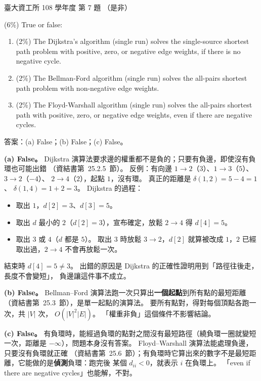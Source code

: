 \begin{pastexam}[label={px:ntu-108-dsaa-07}]{臺大資工所 108 學年度 第 7 題}
（是非）

(6\%) True or false:
\begin{enumerate}[label=(\alph*)]
\item (2\%) The Dijkstra's algorithm (single run) solves the single-source shortest path problem
with positive, zero, or negative edge weights, if there is no negative cycle.
\item (2\%) The Bellman-Ford algorithm (single run) solves the all-pairs shortest path problem
with non-negative edge weights.
\item (2\%) The Floyd-Warshall algorithm (single run) solves the all-pairs shortest path with
positive, zero, or negative edge weights, even if there are negative cycles.
\end{enumerate}
\end{pastexam}

\begin{pastsoln}
答案：(a) False；(b) False；(c) False。

\textbf{(a) False。} Dijkstra 演算法要求邊的權重都不是負的；只要有負邊，即使沒有負環也可能出錯
（資結書第~25.2.5~節）。 反例：有向邊 $1 \to 2$（$3$）、$1 \to 3$（$5$）、$3 \to 2$（$-4$）、
$2 \to 4$（$2$），起點 $1$，沒有環。 真正的距離是 $\delta(1, 2) = 5 - 4 = 1$、
$\delta(1, 4) = 1 + 2 = 3$。 Dijkstra 的過程：
\begin{itemize}
\item 取出 $1$，$d[2] = 3$、$d[3] = 5$。
\item 取出 $d$ 最小的 $2$（$d[2] = 3$），宣布確定，放鬆 $2 \to 4$ 得 $d[4] = 5$。
\item 取出 $3$ 或 $4$（$d$ 都是 $5$）。 取出 $3$ 時放鬆 $3 \to 2$，$d[2]$ 就算被改成 $1$，$2$ 已經
取出過，$2 \to 4$ 不會再放鬆一次。
\end{itemize}
結束時 $d[4] = 5 \ne 3$。 出錯的原因是 Dijkstra 的正確性證明用到「路徑往後走，長度不會變短」，
負邊讓這件事不成立。

\textbf{(b) False。} Bellman--Ford 演算法跑一次只算出\textbf{一個起點}到所有點的最短距離
（資結書第~25.3~節），是單一起點的演算法。 要所有點對，得對每個頂點各跑一次，共 $|V|$ 次，
$O(|V|^2 |E|)$。 「權重非負」這個條件不影響結論。

\textbf{(c) False。} 有負環時，能經過負環的點對之間沒有最短路徑（繞負環一圈就變短一次，距離是
$-\infty$），問題本身沒有答案。 Floyd--Warshall 演算法能處理負邊，只要沒有負環就正確
（資結書第~25.6~節）；有負環時它算出來的數字不是最短距離，它能做的是\textbf{偵測}負環：跑完後
某個 $d_{ii} < 0$，就表示 $i$ 在負環上。 「even if there are negative cycles」也能解，不對。
\end{pastsoln}
